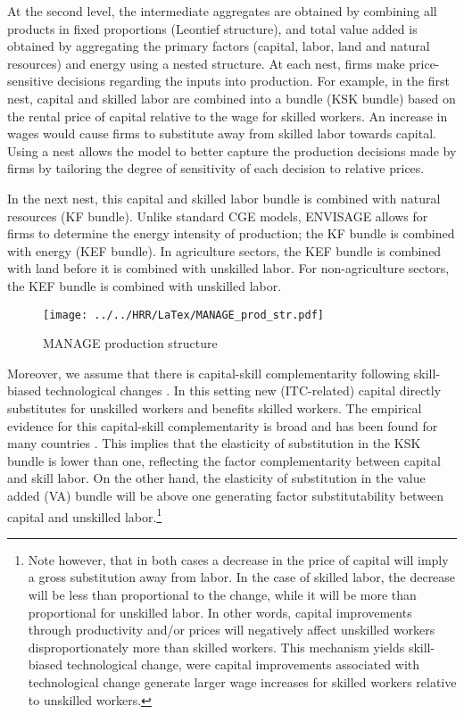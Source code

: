 \documentclass[11pt,english]{article}
\begin{document}
At the second level, the intermediate aggregates are obtained by combining all products in fixed proportions (Leontief structure), and total value added is obtained by aggregating the primary factors (capital, labor, land and natural resources) and energy using a nested structure. At each nest, firms make price-sensitive decisions regarding the inputs into production. For example, in the first nest, capital and skilled labor are combined into a bundle (KSK bundle) based on the rental price of capital relative to the wage for skilled workers. An increase in wages would cause firms to substitute away from skilled labor towards capital. Using a nest allows the model to better capture the production decisions made by firms by tailoring the degree of sensitivity of each decision to relative prices. 

In the next nest, this capital and skilled labor bundle is combined with natural resources (KF bundle). Unlike standard CGE models, ENVISAGE allows for firms to determine the energy intensity of production; the KF bundle is combined with energy (KEF bundle). In agriculture sectors, the KEF bundle is combined with land before it is combined with unskilled labor. For non-agriculture sectors, the KEF bundle is combined with unskilled labor.

\begin{figure}[ht!] \caption{MANAGE production structure} \label{prod_str}
	\centering
	\texttt{[image: ../../HRR/LaTex/MANAGE\_prod\_str.pdf]}
\end{figure}

Moreover, we assume that there is capital-skill complementarity following skill-biased technological changes \citep[cf.][]{Krusell_etal_2000}. In this setting new (ITC-related) capital directly substitutes for unskilled workers and benefits skilled workers. The empirical evidence for this capital-skill complementarity is broad and has been found for many countries \citep{Duffy_etal_2003,Ohanian_etal_2021}. This implies that the elasticity of substitution in the KSK bundle is lower than one, reflecting the factor complementarity between capital and skill labor. On the other hand, the elasticity of substitution in the value added (VA) bundle will be above one generating factor substitutability between capital and unskilled labor.\footnote{Note however, that in both cases a decrease in the price of capital will imply a gross substitution away from labor. In the case of skilled labor, the decrease will be less than proportional to the change, while it will be more than proportional for unskilled labor. In other words, capital improvements through productivity and/or prices will negatively affect unskilled workers disproportionately more than skilled workers. This mechanism yields skill-biased technological change, were capital improvements associated with technological change generate  larger wage increases for skilled workers relative to unskilled workers.} 
\end{document}
